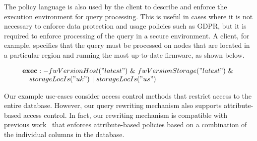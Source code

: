 The policy language is also used by the client to describe and enforce the execution environment for query processing. This is useful in cases where it is not necessary to enforce data protection and usage policies such as GDPR, but it is required to enforce processing of the query in a secure environment. A client, for example, specifies that the query must be processed on nodes that are located in a particular region and running the most up-to-date firmware, as shown below.

\vspace{-4mm}
\[
 \begin{array}{@{}l@{}}
 \textbf{exec}:-fwVersionHost ("latest") ~ \& ~ fwVersionStorage ("latest") ~\&~\\
 ~~~storageLocIs ("uk") ~ | ~ storageLocIs ("us")
 \end{array}
\]
\vspace{-3mm}

Our example use-cases consider access control methods that restrict access to the entire database. However, our query rewriting mechanism also supports attribute-based access control. In fact, our rewriting mechanism is compatible with previous work~\cite{mehta-security-2017} that enforces attribute-based policies based on a combination of the individual columns in the database.


